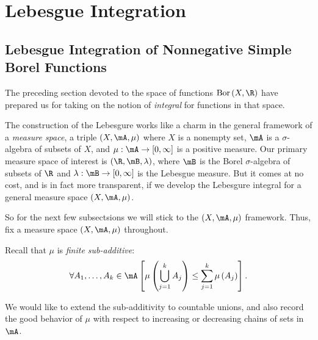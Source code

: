 \documentclass[pmath450]{subfiles}
\begin{document}
    \section{Lebesgue Integration}
    
    \subsection{Lebesgue Integration of Nonnegative Simple Borel Functions}

    The preceding section devoted to the space of functions $\bor\left( X,\R \right)$ have prepared us for taking on the notion of \textit{integral} for functions in that space. 
    
    The construction of the Lebesgure works like a charm in the general framework of a \textit{measure space}, a triple $\left( X,\mA,\mu \right)$ where $X$ is a nonempty set, $\mA$ is a $\sigma$-algebra of subsets of $X$, and $\mu:\mA\to\left[ 0,\infty \right]$ is a positive measure. Our primary measure space of interest is $\left( \R,\mB,\lambda \right)$, where $\mB$ is the Borel $\sigma$-algebra of subsets of $\R$ and $\lambda:\mB\to\left[ 0,\infty \right]$ is the Lebesgue measure. But it comes at no cost, and is in fact more transparent, if we develop the Lebesgure integral for a general measure space $\left( X,\mA,\mu \right)$.

    So for the next few subsectsions we will stick to the $\left( X,\mA,\mu \right)$ framework. Thus, fix a measure space $\left( X,\mA,\mu \right)$ throughout.

    \np Recall that $\mu$ is \textit{finite sub-additive}:
    \begin{equation*}
        \forall A_1,\ldots,A_k\in\mA\left[ \mu\left( \bigcup^{k}_{j=1}A_j \right) \leq \sum^{k}_{j=1}\mu\left( A_j \right) \right].
    \end{equation*}

    \np We would like to extend the sub-additivity to countable unions, and also record the good behavior of $\mu$ with respect to increasing or decreasing chains of sets in $\mA$.
\end{document}
